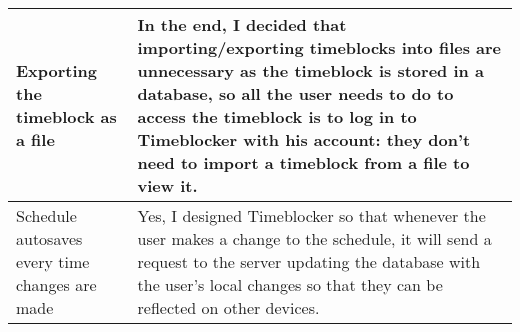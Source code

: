 \documentclass[12pt]{report}
\begin{document}
\begin{xltabular}{\textwidth}{|X|X|}
	\\\hline
	Exporting the timeblock as a file
	&
	In the end, I decided that importing/exporting timeblocks into files are unnecessary as the timeblock is stored in a database, so all the user needs to do to access the timeblock is to log in to Timeblocker with his account: they don't need to import a timeblock from a file to view it.
	\\\hline
	Schedule autosaves every time changes are made
	&
	Yes, I designed Timeblocker so that whenever the user makes a change to the schedule, it will send a request to the server updating the database with the user's local changes so that they can be reflected on other devices.
	\\\hline
\end{xltabular}
\end{document}
